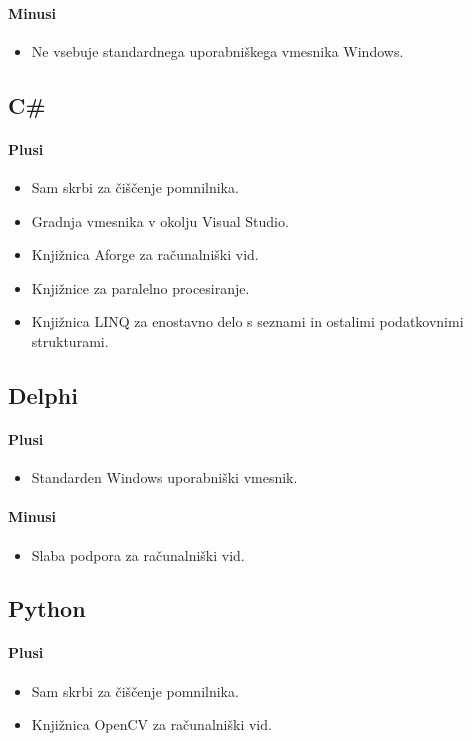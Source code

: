 \documentclass[oneside, a4paper, 12pt]{book}
\begin{document}
\paragraph{Minusi}
\begin{itemize}
\item Ne vsebuje standardnega uporabniškega vmesnika Windows.
\end{itemize}

\subsection{C\#}
\paragraph{Plusi}
\begin{itemize}
\item Sam skrbi za čiščenje pomnilnika.
\item Gradnja vmesnika v okolju Visual Studio.
\item Knjižnica Aforge za računalniški vid.
\item Knjižnice za paralelno procesiranje.
\item Knjižnica LINQ za enostavno delo s seznami in ostalimi podatkovnimi strukturami.
\end{itemize}


\subsection{Delphi}
\paragraph{Plusi}
\begin{itemize}
\item Standarden Windows uporabniški vmesnik.
\end{itemize}
\paragraph{Minusi}
\begin{itemize}
\item Slaba podpora za računalniški vid.
\end{itemize}

\subsection{Python}
\paragraph{Plusi}
\begin{itemize}
\item Sam skrbi za čiščenje pomnilnika.
\item Knjižnica OpenCV za računalniški vid.
\end{itemize}
\end{document}
